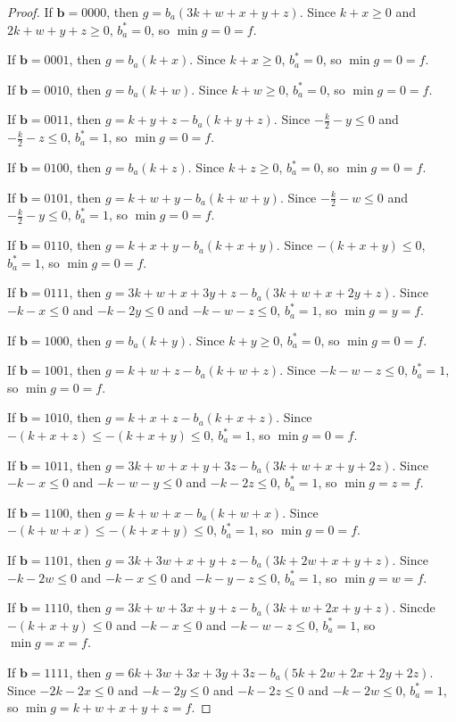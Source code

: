 \documentclass[11pt]{scrartcl}
\newcommand{\vc}[1]{\boldsymbol{#1}}
\begin{document}
\begin{proof}
If $\vc b = 0000$, then $g = b_a(3k + w + x + y + z)$.
Since $k+x \ge 0 $ and $2k + w + y + z \ge 0$, $b_a^* = 0$, so $\min g = 0 = f$.

If $\vc b = 0001$, then $g = b_a(k + x)$.
Since $k+x \ge 0$, $b_a^* = 0$, so $\min g = 0 = f$.

If $\vc b = 0010$, then $g = b_a(k + w)$.
Since $k+w \ge 0$, $b_a^* = 0 $, so $\min g = 0 = f$.

If $\vc b = 0011$, then $g = k + y + z - b_a(k + y + z)$.
Since $-\frac{k}{2} - y \le 0$ and $-\frac{k}{2} - z \le 0$, $b_a^* = 1$, so $\min g = 0 = f$.

If $\vc b = 0100$, then $g = b_a(k + z)$.
Since $k + z \ge 0 $, $b_a^* = 0$, so $\min g = 0 = f$.

If $\vc b = 0101$, then $g = k + w + y - b_a(k + w + y)$.
Since $- \frac{k}{2} - w \le 0$ and $- \frac{k}{2} - y \le 0$, $b_a^* = 1$, so $\min g = 0 = f$.

If $\vc b = 0110$, then $g = k + x + y - b_a(k + x + y)$.
Since $-(k+x+y) \le 0$, $b_a^* = 1$, so $\min g = 0 = f$. 

If $\vc b = 0111$, then $g = 3k + w + x + 3y + z - b_a(3k + w + x + 2y + z)$.
Since $-k - x \le 0$ and $-k - 2y \le 0$ and $-k - w - z \le 0$, $b_a^* = 1$, so $\min g = y = f$.

If $\vc b = 1000$, then $g = b_a(k + y)$.
Since $k + y \ge 0$, $b_a^* = 0 $, so $\min g = 0 = f$.

If $\vc b = 1001$, then $g = k + w + z - b_a(k + w + z)$.
Since $-k - w - z \le 0$, $b_a^* = 1$, so $\min g = 0 = f$.

If $\vc b = 1010$, then $g = k + x + z - b_a(k + x + z)$.
Since $-(k+x+z) \le -(k+x+y) \le 0$, $b_a^* = 1$, so $\min g = 0 = f$.

If $\vc b = 1011$, then $g = 3k + w + x + y + 3z - b_a(3k + w + x + y + 2z)$.
Since $-k - x\le 0 $ and $-k - w - y \le 0$ and $-k - 2z \le 0$, $b_a^* = 1$, so $\min g = z = f$.  

If $\vc b = 1100$, then $g = k + w + x - b_a(k + w + x)$.
Since $-(k+w+x) \le -(k+x+y) \le 0$, $b_a^* = 1$, so $\min g = 0 = f$.

If $\vc b = 1101$, then $g = 3k + 3w + x + y + z - b_a(3k + 2w + x + y + z)$.
Since $-k -2w \le 0$ and $-k - x \le 0$ and $-k -y - z \le 0$, $b_a^* = 1$, so $\min g = w = f$.

If $\vc b = 1110$, then $g = 3k + w + 3x + y + z - b_a(3k + w + 2x + y + z)$.
Sincde $-(k+x+y) \le 0$ and $-k - x \le 0$ and $-k - w - z \le 0$, $b_a^* = 1$, so $\min g = x = f$.

If $\vc b = 1111$, then $g = 6k + 3w + 3x + 3y + 3z - b_a(5k + 2w + 2x + 2y + 2z)$.
Since $-2k - 2x \le 0$ and $-k - 2y \le 0$ and $-k -2z \le 0$ and $-k -2w \le 0$, $b_a^* = 1$, so $\min g = k + w + x + y + z = f$.

\end{proof}
\end{document}
